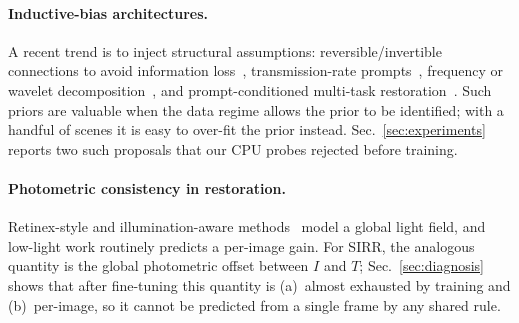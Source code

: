 \paragraph{Inductive-bias architectures.}
A recent trend is to inject structural assumptions: reversible/invertible connections to avoid
information loss~\cite{revcol,rdnet25}, transmission-rate prompts~\cite{rdnet25}, frequency or
wavelet decomposition~\cite{wavelet}, and prompt-conditioned multi-task restoration~\cite{promptir}.
Such priors are valuable when the data regime allows the prior to be identified; with a handful of
scenes it is easy to over-fit the prior instead. Sec.~\ref{sec:experiments} reports two such
proposals that our CPU probes rejected before training.

\paragraph{Photometric consistency in restoration.}
Retinex-style and illumination-aware methods~\cite{retinexformer} model a global light field, and
low-light work routinely predicts a per-image gain. For SIRR, the analogous quantity is the global
photometric offset between $I$ and $T$; Sec.~\ref{sec:diagnosis} shows that after fine-tuning this
quantity is (a)~almost exhausted by training and (b)~per-image, so it cannot be predicted from a
single frame by any shared rule.
